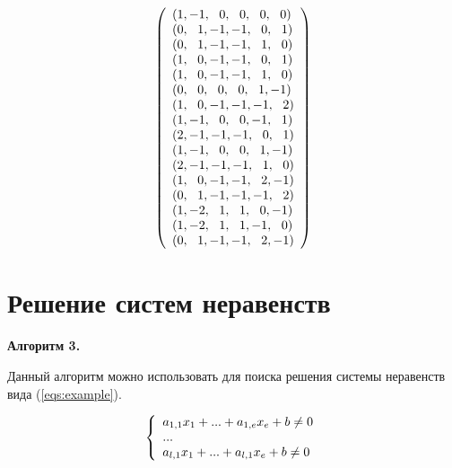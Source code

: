 \documentclass[14pt]{mmcs-article}
\begin{document}
\begin{equation}
  \centering
    \left(
      \begin{array}{ll}
        (1,-1,\ \ 0,\ \ 0,\ \ 0,\ \ 0)\\
        (0,\ \ 1,-1,-1,\ \ 0,\ \ 1)\\
        (0,\ \ 1,-1,-1,\ \ 1,\ \ 0)\\
        (1,\ \ 0,-1,-1,\ \ 0,\ \ 1)\\
        (1,\ \ 0,-1,-1,\ \ 1,\ \ 0)\\
        (0,\ \ 0,\ \ 0,\ \ 0,\ \ 1,-1)\\
        (1,\ \ 0,-1,-1,-1,\ \ 2)\\
        (1,-1,\ \ 0,\ \ 0,-1,\ \ 1)\\
        (2,-1,-1,-1,\ \ 0,\ \ 1)\\
        (1,-1,\ \ 0,\ \ 0,\ \ 1,-1)\\
        (2,-1,-1,-1,\ \ 1,\ \ 0)\\
        (1,\ \ 0,-1,-1,\ \ 2,-1)\\
        (0,\ \ 1,-1,-1,-1,\ \ 2)\\
        (1,-2,\ \ 1,\ \ 1,\ \ 0,-1)\\
        (1,-2,\ \ 1,\ \ 1,-1,\ \ 0)\\
        (0,\ \ 1,-1,-1,\ \ 2,-1)\\
      \end{array}
    \right)
  \label{eqs:2}
\end{equation}


\section{Решение систем неравенств}

\textbf{Алгоритм 3.}

Данный алгоритм можно использовать для поиска решения системы неравенств вида (\ref{eqs:example}).

\begin{equation}
    \centering
    \left\{
        \begin{array}{ll}
            a_{1,1} x_1 + ... + a_{1,e} x_e + b \neq 0\\
            ...\\
            a_{l,1} x_1 + ... + a_{l,1} x_e + b \neq 0\\
        \end{array}
    \right.
    \label{eqs:example}
\end{equation}
\end{document}
